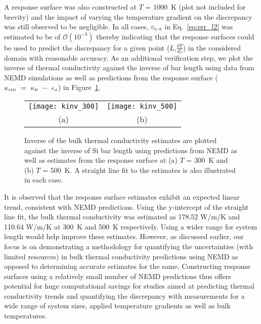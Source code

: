  A response surface was also constructed at $T$ = 1000~K (plot not included for brevity) and the impact of
 varying the temperature gradient on the discrepancy was still observed to be negligible. In all cases,
 $\varepsilon_{\tiny{\mbox{L-2}}}$ in Eq.~\ref{eq:err_l2} was estimated to be of $\mathcal{O}(10^{-3})$ thereby
 indicating that the response surfaces could be used to predict the discrepancy for a given
 point ($L$,$\frac{dT}{dz}$) in the considered domain with reasonable accuracy. As an additional verification
 step, we plot the inverse of thermal conductivity against the inverse of bar length using data from NEMD
 simulations as well as predictions from the response surface 
($\kappa_{\mbox{\tiny{MD}}}~=~\kappa_{\mbox{\tiny{E}}}~-~\epsilon_{\mbox{\tiny{d}}}$) in Figure~\ref{fig:kinv}.
%
\begin{figure}[htbp]
\begin{center}
\begin{tabular}{cc}
 \hspace{-10mm}
  \texttt{[image: kinv\_300]}
  &
  \texttt{[image: kinv\_500]}
  \\ (a) & (b)
  \end{tabular}
 \caption{Inverse of the bulk thermal conductivity estimates are plotted against the inverse of Si bar length
 using predictions from NEMD as well as estimates from the response surface at (a)  $T$ = 300~K and 
 (b) $T$ = 500~K. A straight line fit to the estimates is also illustrated in each case.}
\label{fig:kinv}
\end{center}
\end{figure}
%
It is observed that the response surface estimates exhibit an expected linear trend, consistent with NEMD
  predictions. Using the y-intercept of the straight line fit, the bulk thermal conductivity was estimated
 as 178.52 W/m/K and 110.64 W/m/K at 300~K and 500~K respectively. Using a wider range for system length would
help improve these estimates. However, as discussed earlier, our focus is on demonstrating
a methodology for quantifying the uncertainties (with limited resources) in bulk thermal conductivity predictions
 using NEMD as opposed
to determining accurate estimates for the same. Constructing response surfaces using a
 relatively small number of NEMD predictions thus offers
  potential for huge computational savings for studies aimed at predicting thermal conductivity trends and 
  quantifying the discrepancy with measurements for a wide range of system sizes, applied temperature gradients as 
  well as bulk temperatures.

